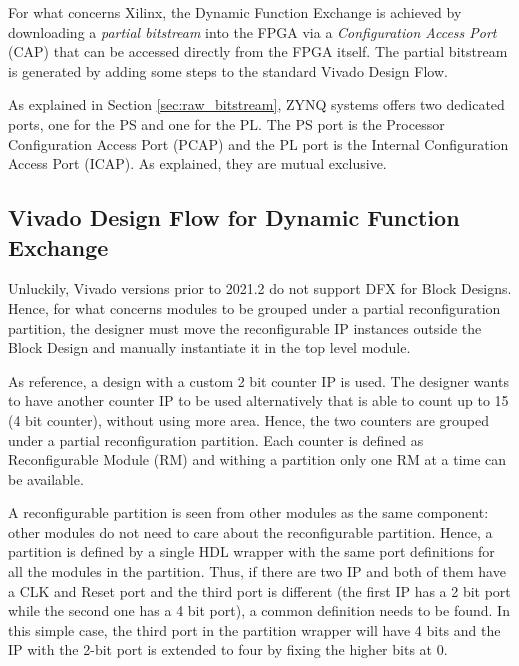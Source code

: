 For what concerns Xilinx, the Dynamic Function Exchange is achieved by downloading a \textit{partial bitstream} into the FPGA via a \textit{Configuration Access Port} (CAP) that can be accessed directly from the FPGA itself. The partial bitstream is generated by adding some steps to the standard Vivado Design Flow. \bigskip

As explained in Section \ref{sec:raw_bitstream}, ZYNQ systems offers two dedicated ports, one for the PS and one for the PL. The PS port is the Processor Configuration Access Port (PCAP) and the PL port is the Internal Configuration Access Port (ICAP). As explained, they are mutual exclusive. 


\subsection{Vivado Design Flow for Dynamic Function Exchange}

Unluckily, Vivado versions prior to 2021.2 do not support DFX for Block Designs. Hence, for what concerns modules to be grouped under a partial reconfiguration partition, the designer must move the reconfigurable IP instances outside the Block Design and manually instantiate  it in the top level module. \bigskip

As reference, a design with a custom 2 bit counter IP is used. The designer wants to have another counter IP to be used alternatively that is able to count up to 15 (4 bit counter), without using more area. Hence, the two counters are grouped under a partial reconfiguration partition. Each counter is defined as Reconfigurable Module (RM) and withing a partition only one RM at a time can be available. \bigskip

A reconfigurable partition is seen from other modules as the same component: other modules do not need to care about the reconfigurable partition. Hence, a partition is defined by a single HDL wrapper with the same port definitions for all the modules in the partition. Thus, if there are two IP and both of them have a CLK and Reset port and the third port is different (the first IP has a 2 bit port while the second one has a 4 bit port), a common definition needs to be found. In this simple case, the third port in the partition wrapper will have 4 bits and the IP with the 2-bit port is extended to four by fixing the higher bits at 0.\bigskip 

